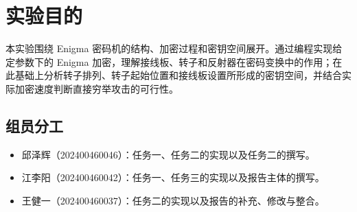 \documentclass{CST_CryptoIntro}
\begin{document}
\maketitle
\thispagestyle{fancy}
\newpage

\tableofcontents
\newpage

\section{实验目的}

本实验围绕 Enigma 密码机的结构、加密过程和密钥空间展开。通过编程实现给定参数下的 Enigma 加密，理解接线板、转子和反射器在密码变换中的作用；在此基础上分析转子排列、转子起始位置和接线板设置所形成的密钥空间，并结合实际加密速度判断直接穷举攻击的可行性。

\subsection{组员分工}
\begin{itemize}
    \item 邱泽辉（202400460046）：任务一、任务二的实现以及任务二的撰写。
    \item 江李阳（202400460042）：任务一、任务三的实现以及报告主体的撰写。
    \item 王健一（202400460037）：任务二的实现以及报告的补充、修改与整合。
\end{itemize}














\end{document}
